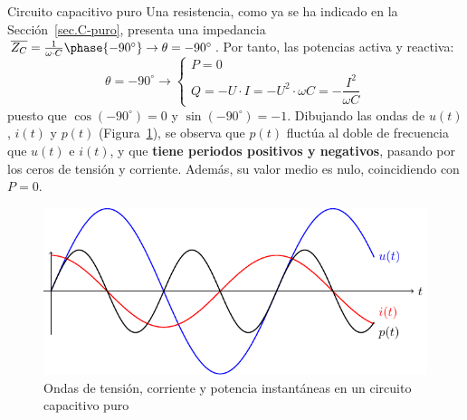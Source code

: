 \documentclass[11pt]{book} %
\makeatletter
\numberwithin{dummy}{section}
\theoremstyle{ocrenumbox}
\theoremstyle{blacknumex}
\theoremstyle{blacknumbox}
\theoremstyle{ocrenum}
\renewcommand{\subsection}{\@startsection {subsection}{2}{\z@}
{-3ex \@plus -0.1ex \@minus -.4ex}
{0.5ex \@plus.2ex }
{\normalfont\sffamily\bfseries}}
\makeatother
\begin{document}
	\subsection{Circuito capacitivo puro}\label{sec.potencia_C}
	Una resistencia, como ya se ha indicado en la Sección~\ref{sec.C-puro}, presenta una impedancia $\overline{Z_C}=\frac{1}{\omega\cdot C}\phase{-90^\circ}\rightarrow \theta=-90^\circ$. Por tanto, las potencias activa y reactiva: 
	\begin{equation}
		\theta = -90^\circ \rightarrow
		\boxed{\begin{cases}
				P = 0\\
				Q = -U\cdot I = -U^2\cdot \omega C = -\dfrac{I^2}{\omega C}
		\end{cases}}
	\end{equation}
	puesto que $\cos(-90^\circ)=0$ y $\sin(-90^\circ)=-1$. Dibujando las ondas de $u(t)$, $i(t)$ y $p(t)$ (Figura~\ref{fig.capacitivoPotencia}), se observa que $p(t)$ fluctúa al doble de frecuencia que $u(t)$ e $i(t)$, y que \textbf{tiene periodos positivos y negativos}, pasando por los ceros de tensión y corriente. Además, su valor medio es nulo, coincidiendo con $P=0$.
	\begin{figure}[htbp]
		\centering
		\includegraphics{../figs/capacitivoPuroPotencia.pdf}
		\caption{Ondas de tensión, corriente y potencia instantáneas en un circuito capacitivo puro}
		\label{fig.capacitivoPotencia}
	\end{figure}
	
\end{document}
